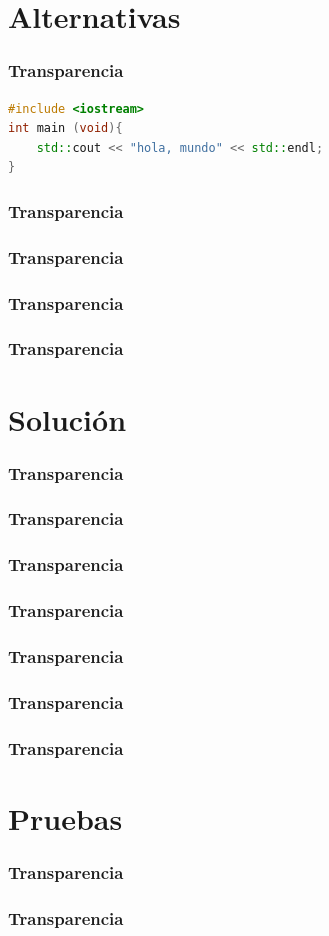 \documentclass{beamer}
\begin{document}
    \section{Alternativas}
    \begin{frame}[fragile]
        \frametitle{Transparencia}
            \begin{lstlisting}[language={C++},
                   label={lst:slide_two_columns},
                   caption={Hola mundo en C++}]
#include <iostream>
int main (void){
    std::cout << "hola, mundo" << std::endl;
}
            \end{lstlisting}
    \end{frame}
    \begin{frame}
        \frametitle{Transparencia}
    \end{frame}
    \begin{frame}
        \frametitle{Transparencia}
    \end{frame}
    \begin{frame}
        \frametitle{Transparencia}
    \end{frame}
    \begin{frame}
        \frametitle{Transparencia}
    \end{frame}
    \section{Solución}
    \begin{frame}
        \frametitle{Transparencia}
    \end{frame}
    \begin{frame}
        \frametitle{Transparencia}
    \end{frame}
    \begin{frame}
        \frametitle{Transparencia}
    \end{frame}
    \begin{frame}
        \frametitle{Transparencia}
    \end{frame}
    \begin{frame}
        \frametitle{Transparencia}
    \end{frame}
    \begin{frame}
        \frametitle{Transparencia}
    \end{frame}
    \begin{frame}
        \frametitle{Transparencia}
    \end{frame}
    \section{Pruebas}
    \begin{frame}
        \frametitle{Transparencia}
    \end{frame}
    \begin{frame}
        \frametitle{Transparencia}
    \end{frame}
\end{document}
